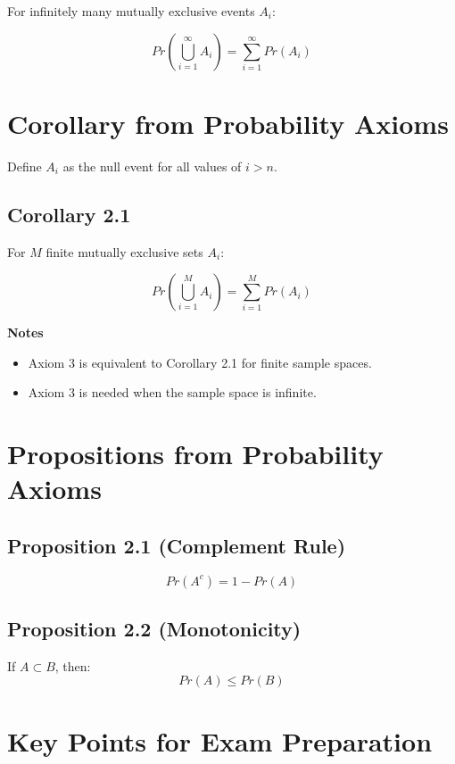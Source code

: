 \documentclass[12pt]{article}
\begin{document}
For infinitely many mutually exclusive events $A_i$:

\[
Pr\left(\bigcup_{i=1}^{\infty} A_i\right)
= \sum_{i=1}^{\infty} Pr(A_i)
\]

\section{Corollary from Probability Axioms}

Define $A_i$ as the null event for all values of $i>n$.

\subsection*{Corollary 2.1}

For $M$ finite mutually exclusive sets $A_i$:

\[
Pr\left(\bigcup_{i=1}^{M} A_i\right)
= \sum_{i=1}^{M} Pr(A_i)
\]

\textbf{Notes}
\begin{itemize}
\item Axiom 3 is equivalent to Corollary 2.1 for finite sample spaces.
\item Axiom 3 is needed when the sample space is infinite.
\end{itemize}

\section{Propositions from Probability Axioms}

\subsection*{Proposition 2.1 (Complement Rule)}

\[
Pr(A^c) = 1 - Pr(A)
\]

\subsection*{Proposition 2.2 (Monotonicity)}

If $A \subset B$, then:
\[
Pr(A) \le Pr(B)
\]

\section*{Key Points for Exam Preparation}
\end{document}
